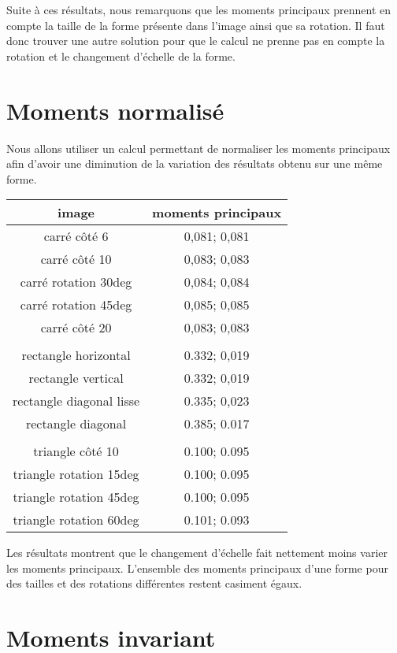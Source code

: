 \documentclass{article}
\begin{document}
  Suite à ces résultats, nous remarquons que les moments principaux prennent en compte 
  la taille de la forme présente dans l'image ainsi que sa rotation.
  Il faut donc trouver une autre solution pour que le calcul ne prenne pas en compte la rotation
  et le changement d'échelle de la forme.
  
  \section{Moments normalisé}
  Nous allons utiliser un calcul permettant de normaliser les moments principaux afin d'avoir
  une diminution de la variation des résultats obtenu sur une même forme.\\
  
   \begin{center}
    \begin{tabular}{|c|c|}
      \hline
      \textbf{image} & \textbf{moments principaux} \\
      \hline
      carré côté 6 & 0,081; 0,081 \\
      \hline
      carré côté 10 & 0,083; 0,083 \\
      \hline
      carré rotation 30deg & 0,084; 0,084 \\
      \hline
      carré rotation 45deg & 0,085; 0,085 \\
      \hline
      carré côté 20 & 0,083; 0,083 \\
      \hline
       & \\
      \hline
      rectangle horizontal & 0.332; 0,019 \\
      \hline
      rectangle vertical & 0.332; 0,019 \\
      \hline
      rectangle diagonal lisse & 0.335; 0,023 \\
      \hline
      rectangle diagonal & 0.385; 0.017 \\
      \hline
       & \\
      \hline
      triangle côté 10 & 0.100; 0.095\\
      \hline
      triangle rotation 15deg & 0.100; 0.095\\
      \hline
      triangle rotation 45deg & 0.100; 0.095\\
      \hline
      triangle rotation 60deg & 0.101; 0.093\\
      \hline
    \end{tabular}
  \end{center}
  
  Les résultats montrent que le changement d'échelle fait nettement moins varier les moments
  principaux. L'ensemble des moments principaux d'une forme pour des tailles et des rotations
  différentes restent casiment égaux.\\
  
  \section{Moments invariant}
  
    
\end{document}
